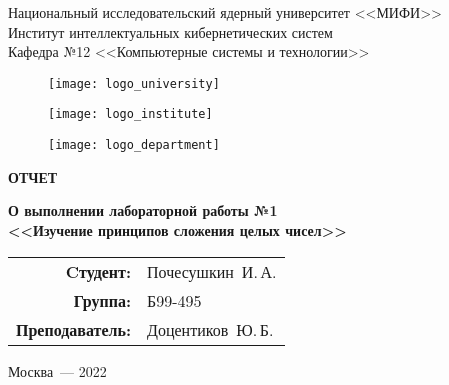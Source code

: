 \begin{titlepage}
  \begin{center}
    \begin{large}
      Национальный исследовательский ядерный университет <<МИФИ>> \\
      \vspace{0.25cm}
      Институт интеллектуальных кибернетических систем \\
      \vspace{0.25cm}
      Кафедра №12 <<Компьютерные системы и технологии>>
    \end{large}

    \vspace*{1cm}

    \begin{figure}[H]
      \centering
      \begin{minipage}[c]{0.3\textwidth}
        \texttt{[image: logo\_university]}
      \end{minipage}
      \hfill
      \begin{minipage}[c]{0.3\textwidth}
        \texttt{[image: logo\_institute]}
      \end{minipage}
      \hfill
      \begin{minipage}[c]{0.3\textwidth}
        \texttt{[image: logo\_department]}
      \end{minipage}
    \end{figure}

    \vspace{4cm}

    \begin{huge}
      \textbf{ОТЧЕТ}
    \end{huge}

    \begin{large}
      \textbf{О выполнении лабораторной работы №1 \\
        <<Изучение принципов сложения целых чисел>>}
    \end{large}
    
    \vfill
    
    \begin{flushright}
      \begin{tabular}{ r l }
        \textbf{Cтудент:} & Почесушкин~И.\,А. \\ 
        \textbf{Группа:} & Б99-495 \\  
        \textbf{Преподаватель:} & Доцентиков~Ю.\,Б. \\
      \end{tabular}
    \end{flushright}
            
    Москва~--- 2022
  \end{center}
\end{titlepage}
